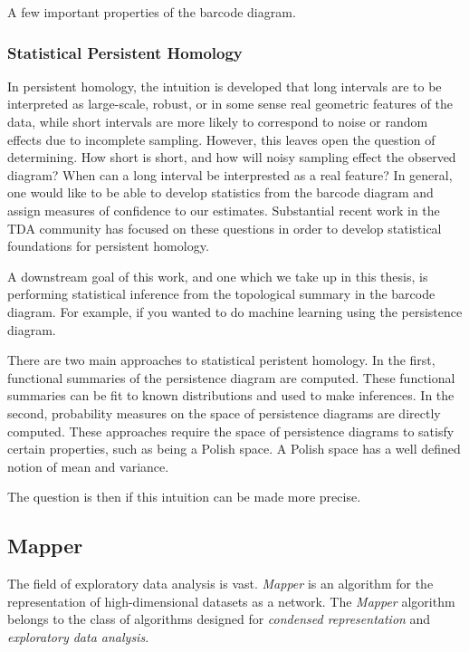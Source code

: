 A few important properties of the barcode diagram.

\subsubsection{Statistical Persistent Homology}

In persistent homology, the intuition is developed that long intervals are to be interpreted as large-scale, robust, or in some sense real geometric features of the data, while short intervals are more likely to correspond to noise or random effects due to incomplete sampling.
However, this leaves open the question of determining.
How short is short, and how will noisy sampling effect the observed diagram?
When can a long interval be interprested as a real feature?
In general, one would like to be able to develop statistics from the barcode diagram and assign measures of confidence to our estimates.
Substantial recent work in the TDA community has focused on these questions in order to develop statistical foundations for persistent homology.

A downstream goal of this work, and one which we take up in this thesis, is performing statistical inference from the topological summary in the barcode diagram.
For example, if you wanted to do machine learning using the persistence diagram.

There are two main approaches to statistical peristent homology.
In the first, functional summaries of the persistence diagram are computed.
These functional summaries can be fit to known distributions and used to make inferences.
In the second, probability measures on the space of persistence diagrams are directly computed.
These approaches require the space of persistence diagrams to satisfy certain properties, such as being a Polish space.
A Polish space has a well defined notion of mean and variance.


The question is then if this intuition can be made more precise.


\subsection{Mapper}

The field of exploratory data analysis is vast.
\emph{Mapper} is an algorithm for the representation of high-dimensional datasets as a network.
The \emph{Mapper} algorithm belongs to the class of algorithms designed for \emph{condensed representation} and \emph{exploratory data analysis}.


